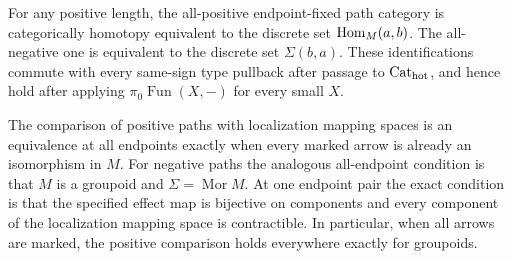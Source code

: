 \begin{proposition}
\label{F:one-sign-paths}
For any positive length, the all-positive endpoint-fixed path
category is categorically homotopy equivalent to the discrete set
$\operatorname{Hom}_M(a,b)$. The all-negative one is equivalent to the discrete
set $\Sigma(b,a)$. These identifications commute with every
same-sign type pullback after passage to
$\mathrm {Cat}_{\mathrm{hot}}$, and hence hold after applying
$\pi_0\operatorname{Fun}(X,-)$ for every small $X$.

The comparison of positive paths with localization mapping spaces
is an equivalence at all endpoints exactly when every marked arrow
is already an isomorphism in $M$. For negative paths the analogous
all-endpoint condition is that $M$ is a groupoid and
$\Sigma=\operatorname{Mor}M$. At one endpoint pair the exact
condition is that the specified effect map is bijective on
components and every component of the localization mapping space
is contractible. In particular, when all arrows are marked, the
positive comparison holds everywhere exactly for groupoids.
\end{proposition}
